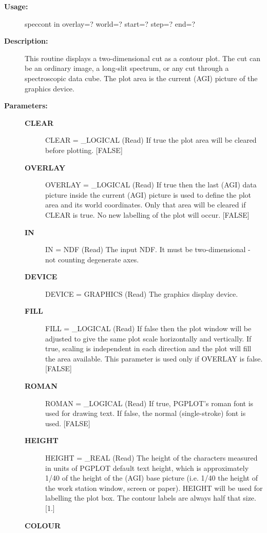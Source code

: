 \begin{description}

\item [{\bf Usage:}]

   speccont in overlay=? world=? start=? step=? end=?


\item [{\bf Description:}]

   This routine displays a two-dimensional cut as a contour plot. The
   cut can be an ordinary image, a long-slit spectrum, or any cut
   through a spectroscopic data cube. The plot area is the current
   (AGI) picture of the graphics device.


\item [{\bf Parameters:}]
\begin{description}
\item [{\bf CLEAR}]
CLEAR = _LOGICAL (Read)
   If true the plot area will be cleared before plotting. [FALSE]
\item [{\bf OVERLAY}]
OVERLAY = _LOGICAL (Read)
   If true then the last (AGI) data picture inside the current
   (AGI) picture is used to define the plot area and its world
   coordinates. Only that area will be cleared if CLEAR is true.
   No new labelling of the plot will occur. [FALSE]
\item [{\bf IN}]
IN = NDF (Read)
   The input NDF. It must be two-dimensional - not counting
   degenerate axes.
\item [{\bf DEVICE}]
DEVICE = GRAPHICS (Read)
   The graphics display device.
\item [{\bf FILL}]
FILL = _LOGICAL (Read)
   If false then the plot window will be adjusted to give the same
   plot scale horizontally and vertically. If true, scaling is
   independent in each direction and the plot will fill the area
   available. This parameter is used only if OVERLAY is false.
   [FALSE]
\item [{\bf ROMAN}]
ROMAN = _LOGICAL (Read)
   If true, PGPLOT's roman font is used for drawing text.  If
   false, the normal (single-stroke) font is used. [FALSE]
\item [{\bf HEIGHT}]
HEIGHT = _REAL (Read)
   The height of the characters measured in units of PGPLOT
   default text height, which is approximately 1/40 of the height
   of the (AGI) base picture (i.e. 1/40 the height of the
   work station window, screen or paper). HEIGHT will be used for
   labelling the plot box. The contour labels are always half that
   size. [1.]
\item [{\bf COLOUR}]

\end{description}
\end{description}
